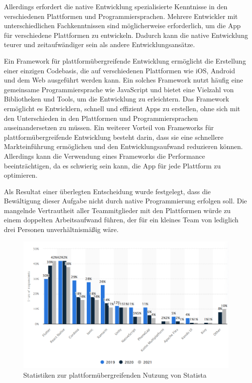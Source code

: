 Allerdings erfordert die native Entwicklung spezialisierte Kenntnisse in den verschiedenen Plattformen und Programmiersprachen. Mehrere Entwickler mit unterschiedlichen Fachkenntnissen sind möglicherweise erforderlich, um die App für verschiedene Plattformen zu entwickeln. Dadurch kann die native Entwicklung teurer und zeitaufwändiger sein als andere Entwicklungsansätze.

Ein Framework für plattformübergreifende Entwicklung ermöglicht die Erstellung einer einzigen Codebasis, die auf verschiedenen Plattformen wie iOS, Android und dem Web ausgeführt werden kann. Ein solches Framework nutzt häufig eine gemeinsame Programmiersprache wie JavaScript und bietet eine Vielzahl von Bibliotheken und Tools, um die Entwicklung zu erleichtern. Das Framework ermöglicht es Entwicklern, schnell und effizient Apps zu erstellen, ohne sich mit den Unterschieden in den Plattformen und Programmiersprachen auseinandersetzen zu müssen. Ein weiterer Vorteil von Frameworks für plattformübergreifende Entwicklung besteht darin, dass sie eine schnellere Markteinführung ermöglichen und den Entwicklungsaufwand reduzieren können. Allerdings kann die Verwendung eines Frameworks die Performance beeinträchtigen, da es schwierig sein kann, die App für jede Plattform zu optimieren.

Als Resultat einer überlegten Entscheidung wurde festgelegt, dass die Bewältigung dieser Aufgabe nicht durch native Programmierung erfolgen soll. Die mangelnde Vertrautheit aller Teammitglieder mit den Plattformen würde zu einem doppelten Arbeitsaufwand führen, der für ein kleines Team von lediglich drei Personen unverhältnismäßig wäre.

\begin{figure}[htbp]
    \centering
    \includegraphics[width=1\textwidth]{pics/cross-platform-statisitics.png}
    \caption{Statistiken zur plattformübergreifenden Nutzung von Statista \cite{statista-software-developer-working-hours} }
    \label{fig:cross-platform-stats}
\end{figure}

